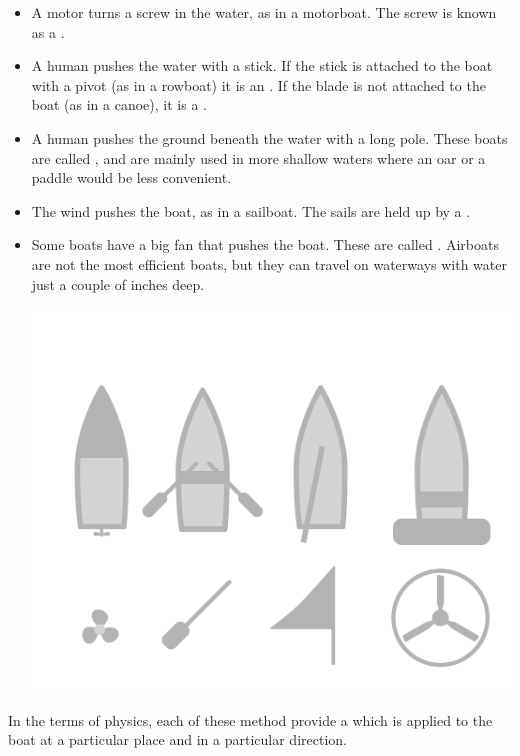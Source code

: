 \begin{itemize}


\item A motor turns a screw in the water, as in a motorboat. The screw is known as a . 

\item A human pushes the water with a stick.  If the stick is attached to the boat with a pivot (as in a rowboat) it is an .  If the blade is not attached to the boat (as in a canoe), it is a .

\item A human pushes the ground beneath the water with a long pole. These boats are called , and are mainly used in more shallow waters where an oar or a paddle would be less convenient.

\item The wind pushes the boat,  as in a sailboat. The sails are held up by a .
\item Some boats have a big fan that pushes the boat.  These are called .   Airboats are not the most efficient boats,  but they can travel
on waterways with water just a couple of inches deep.

\begin{center}
    \includegraphics[width=.75\textwidth]{boatTypes.png}
    
\end{center}

\end{itemize}

In the terms of physics, each of these method provide a  which is applied to the boat at a particular place and in a particular direction.

